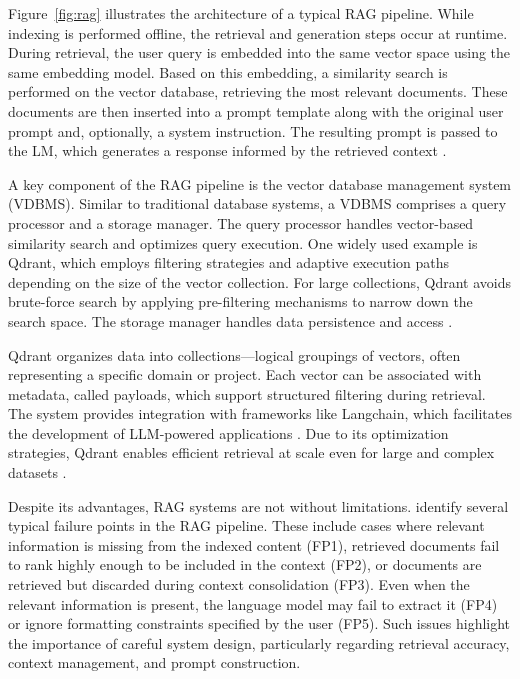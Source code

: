 \documentclass[a4paper,oneside,bibliography=totoc]{scrbook}
\begin{document}
Figure~\ref{fig:rag} illustrates the architecture of a typical RAG pipeline. While indexing is performed offline, the retrieval and generation steps occur at runtime. During retrieval, the user query is embedded into the same vector space using the same embedding model. Based on this embedding, a similarity search is performed on the vector database, retrieving the most relevant documents. These documents are then inserted into a prompt template along with the original user prompt and, optionally, a system instruction. The resulting prompt is passed to the \ac{LM}, which generates a response informed by the retrieved context \cite{Gao2024}.

A key component of the \ac{RAG} pipeline is the vector database management system (\ac{VDBMS}). Similar to traditional database systems, a \ac{VDBMS} comprises a query processor and a storage manager. The query processor handles vector-based similarity search and optimizes query execution. One widely used example is Qdrant, which employs filtering strategies and adaptive execution paths depending on the size of the vector collection. For large collections, Qdrant avoids brute-force search by applying pre-filtering mechanisms to narrow down the search space. The storage manager handles data persistence and access \cite{Pan2024,Qdrant2025}.

Qdrant organizes data into collections—logical groupings of vectors, often representing a specific domain or project. Each vector can be associated with metadata, called payloads, which support structured filtering during retrieval. The system provides integration with frameworks like Langchain, which facilitates the development of LLM-powered applications \cite{LangChain2025d}. Due to its optimization strategies, Qdrant enables efficient retrieval at scale even for large and complex datasets \cite{Pan2024,Qdrant2025}.

Despite its advantages, RAG systems are not without limitations. \citet{Barnett2024} identify several typical failure points in the RAG pipeline. These include cases where relevant information is missing from the indexed content (FP1), retrieved documents fail to rank highly enough to be included in the context (FP2), or documents are retrieved but discarded during context consolidation (FP3). Even when the relevant information is present, the language model may fail to extract it (FP4) or ignore formatting constraints specified by the user (FP5). Such issues highlight the importance of careful system design, particularly regarding retrieval accuracy, context management, and prompt construction.
\end{document}
